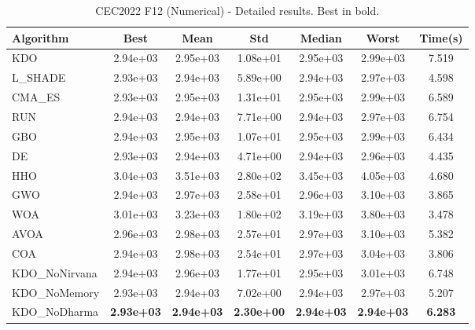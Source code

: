 \begin{table}[H]
\centering\small
\caption{CEC2022 F12 (Numerical) - Detailed results. Best in bold.}
\label{tab:cec2022_F12}
\begin{tabular}{lcccccc}
\toprule
\textbf{Algorithm} & \textbf{Best} & \textbf{Mean} & \textbf{Std} & \textbf{Median} & \textbf{Worst} & \textbf{Time(s)} \\
\midrule
KDO & 2.94e+03 & 2.95e+03 & 1.08e+01 & 2.95e+03 & 2.99e+03 & 7.519 \\
L_SHADE & 2.93e+03 & 2.94e+03 & 5.89e+00 & 2.94e+03 & 2.97e+03 & 4.598 \\
CMA_ES & 2.93e+03 & 2.95e+03 & 1.31e+01 & 2.95e+03 & 2.99e+03 & 6.589 \\
RUN & 2.94e+03 & 2.94e+03 & 7.71e+00 & 2.94e+03 & 2.97e+03 & 6.754 \\
GBO & 2.94e+03 & 2.95e+03 & 1.07e+01 & 2.95e+03 & 2.99e+03 & 6.434 \\
DE & 2.93e+03 & 2.94e+03 & 4.71e+00 & 2.94e+03 & 2.96e+03 & 4.435 \\
HHO & 3.04e+03 & 3.51e+03 & 2.80e+02 & 3.45e+03 & 4.05e+03 & 4.680 \\
GWO & 2.94e+03 & 2.97e+03 & 2.58e+01 & 2.96e+03 & 3.10e+03 & 3.865 \\
WOA & 3.01e+03 & 3.23e+03 & 1.80e+02 & 3.19e+03 & 3.80e+03 & 3.478 \\
AVOA & 2.96e+03 & 2.98e+03 & 2.57e+01 & 2.97e+03 & 3.10e+03 & 5.382 \\
COA & 2.94e+03 & 2.98e+03 & 2.54e+01 & 2.97e+03 & 3.04e+03 & 3.806 \\
KDO_NoNirvana & 2.94e+03 & 2.96e+03 & 1.77e+01 & 2.95e+03 & 3.01e+03 & 6.748 \\
KDO_NoMemory & 2.93e+03 & 2.94e+03 & 7.02e+00 & 2.94e+03 & 2.97e+03 & 5.207 \\
KDO_NoDharma & \textbf{2.93e+03} & \textbf{2.94e+03} & \textbf{2.30e+00} & \textbf{2.94e+03} & \textbf{2.94e+03} & \textbf{6.283} \\
\bottomrule
\end{tabular}
\end{table}
